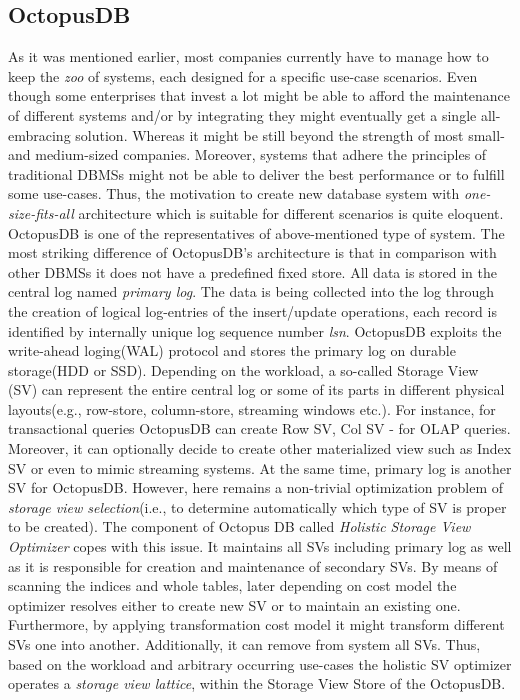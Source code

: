 \documentclass[10pt, conference, compsocconf]{IEEEtran}
\begin{document}
\subsection{OctopusDB}
As it was mentioned earlier, most companies currently have to manage how to keep the \textit{zoo} of systems, each designed for a specific use-case scenarios. Even though some enterprises that invest a lot might be able to afford the maintenance of different systems and/or by integrating they might eventually get a single all-embracing solution. Whereas it might be still beyond the strength of most small- and medium-sized companies. Moreover, systems that adhere the principles of traditional DBMSs might not be able to deliver the best performance or to fulfill some use-cases. Thus, the motivation to create new database system with \textit{one-size-fits-all} architecture which is suitable for different scenarios is quite eloquent. 
OctopusDB is one of the representatives of above-mentioned type of system. The most striking difference of OctopusDB's architecture is that in comparison with other DBMSs it does not have a predefined fixed store. All data is stored in the central log named \textit{primary log}. The data is being collected into the log through the creation of logical log-entries of the insert/update operations, each record is identified by internally unique log sequence number \textit{lsn}. OctopusDB exploits the write-ahead loging(WAL) protocol and stores the primary log on durable storage(HDD or SSD). Depending on the workload, a so-called Storage View (SV) can represent the entire central log or some of its parts in different physical layouts(e.g., row-store, column-store, streaming windows etc.). For instance, for transactional queries OctopusDB can create Row SV, Col SV - for OLAP queries. Moreover,  it can optionally decide to create other materialized view such as Index SV or even to mimic streaming systems. At the same time, primary log is another SV for OctopusDB.  However, here remains a non-trivial optimization problem of \textit{storage view selection}(i.e., to determine automatically which type of SV is proper to be created). The component of Octopus DB called \textit{Holistic Storage View Optimizer} copes with this issue. It maintains all SVs including primary log as well as it is responsible for creation and maintenance of secondary SVs. By means of scanning the indices and whole tables, later  depending on cost model the optimizer resolves either to create new SV or to maintain an existing one. Furthermore, by applying transformation cost model it might transform different SVs one into another. Additionally, it can remove from system all SVs. Thus, based on the workload and arbitrary occurring use-cases the holistic SV optimizer operates a \textit{storage view lattice}, within the Storage View Store of the OctopusDB.
\end{document}
